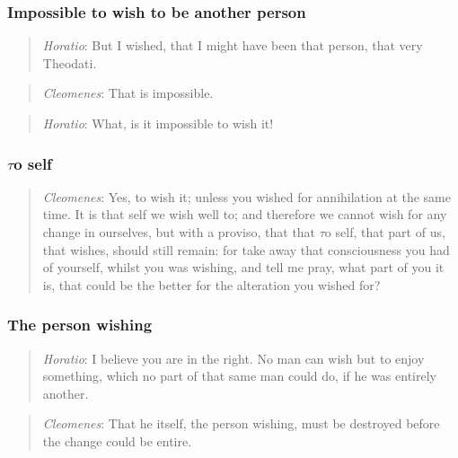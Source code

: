         \subsubsection{Impossible to wish to be another person}

            \begin{quote}
                \textit{Horatio}: But I wished, that I might have been that person, that very Theodati.
            \end{quote}

            \begin{quote}
                \textit{Cleomenes}: That is impossible.
            \end{quote}

            \begin{quote}
                \textit{Horatio}: What, is it impossible to wish it!
            \end{quote}

        \subsubsection{\(\tau\)o self}

            \begin{quote}
                \textit{Cleomenes}: Yes, to wish it; unless you wished for annihilation at the same time. It is that self we wish well to; and therefore we cannot wish for any change in ourselves, but with a proviso, that that \(\tau\)o self, that part of us, that wishes, should still remain: for take away that consciousness you had of yourself, whilst you was wishing, and tell me pray, what part of you it is, that could be the better for the alteration you wished for?
            \end{quote}

        \subsubsection{The person wishing}

            \begin{quote}
                \textit{Horatio}: I believe you are in the right. No man can wish but to enjoy something, which no part of that same man could do, if he was entirely another.
            \end{quote}

            \begin{quote}
                \textit{Cleomenes}: That he itself, the person wishing, must be destroyed before the change could be entire.
            \end{quote}

